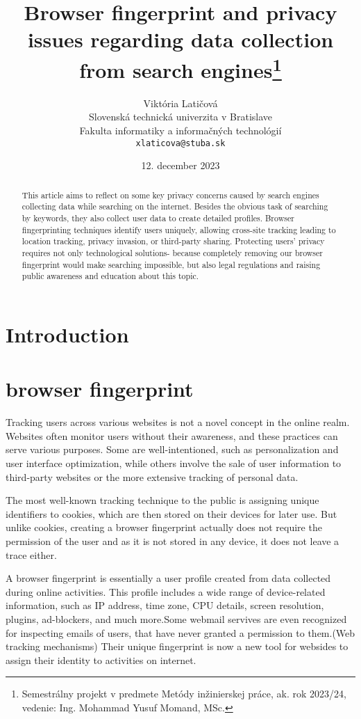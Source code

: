 \documentclass[10pt,a4paper,]{article}
\title{Browser fingerprint and privacy issues regarding data collection from search engines\thanks{Semestrálny projekt v predmete Metódy inžinierskej práce, ak. rok 2023/24, vedenie: Ing. Mohammad Yusuf Momand, MSc.}} %
\author{Viktória Latičová\\[2pt]
	{\small Slovenská technická univerzita v Bratislave}\\
	{\small Fakulta informatiky a informačných technológií}\\
	{\small \texttt{xlaticova@stuba.sk}}
	}
\date{\small 12. december 2023} %
\begin{document}
\maketitle

\begin{abstract}
This article aims to reflect on some key privacy concerns caused by search engines collecting data while searching on the internet. Besides the obvious task of searching by keywords, they also collect user data
to create detailed profiles. Browser fingerprinting techniques identify users uniquely, allowing cross-site tracking leading to location tracking, privacy invasion, or third-party sharing. Protecting users' privacy requires not only technological solutions- because completely removing our browser fingerprint would make searching impossible, but also legal regulations and raising public awareness and education about this topic.
\end{abstract}


\section{Introduction}
\section{browser fingerprint} 
Tracking users across various websites is not a novel concept in the online realm. Websites often monitor users without their awareness, and these practices can serve various purposes. Some are well-intentioned, such as personalization and user interface optimization, while others involve the sale of user information to third-party websites or the more extensive tracking of personal data.

The most well-known tracking technique to the public is assigning unique identifiers to cookies, which are then stored on their devices for later use. But unlike cookies, creating a browser fingerprint actually does not require the permission of the user and as it is not stored in any device, it does not leave a trace either. 

A browser fingerprint is essentially a user profile created from data collected during online activities. This profile includes a wide range of device-related information, such as IP address, time zone, CPU details, screen resolution, plugins, ad-blockers, and much more.Some webmail servives are even recognized for inspecting emails of users, that have never granted a permission to them.(Web tracking mechanisms) Their unique fingerprint is now a new tool for websides to assign their identity to activities on internet. 
\end{document}
